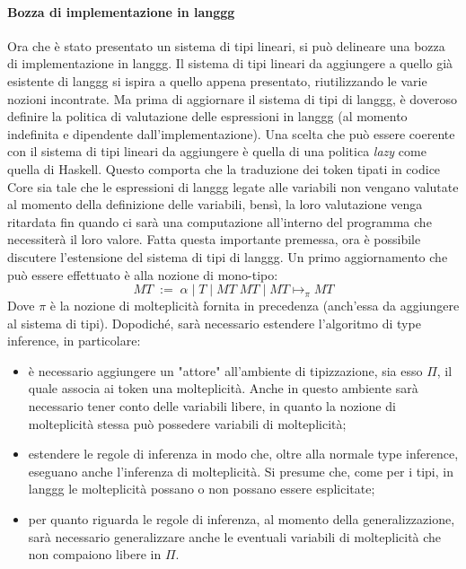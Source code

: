\documentclass[10pt,a4paper]{article}
\begin{document}
\paragraph{Bozza di implementazione in langgg}
Ora che è stato presentato un sistema di tipi lineari, si può delineare una bozza di implementazione in langgg.
Il sistema di tipi lineari da aggiungere a quello già esistente di langgg si ispira a quello appena presentato,
riutilizzando le varie nozioni incontrate. Ma prima di aggiornare il sistema di tipi di langgg, è doveroso definire
la politica di valutazione delle espressioni in langgg (al momento indefinita e dipendente dall'implementazione).
Una scelta che può essere coerente con il sistema di tipi lineari da aggiungere è quella di una politica \textit{lazy}
come quella di Haskell. Questo comporta che la traduzione dei token tipati in codice Core sia tale che le espressioni
di langgg legate alle variabili non vengano valutate al momento della definizione delle variabili, bensì, la loro
valutazione venga ritardata fin quando ci sarà una computazione all'interno del programma che necessiterà il loro
valore. Fatta questa importante premessa, ora è possibile discutere l'estensione del sistema di tipi di langgg.
Un primo aggiornamento che può essere effettuato è alla nozione di mono-tipo:
\[ MT \; := \; \alpha \; | \; T \; | \; MT \; MT \; | \; MT \mapsto_{\pi} MT \]
Dove $ \pi $ è la nozione di molteplicità fornita in precedenza (anch'essa da aggiungere al sistema di tipi).
Dopodiché, sarà necessario estendere l'algoritmo di type inference, in particolare:
\begin{itemize}
    \item è necessario aggiungere un "attore" all'ambiente di tipizzazione, sia esso $ \Pi $, il quale associa ai
    token una molteplicità. Anche in questo ambiente sarà necessario tener conto delle variabili libere, in quanto
    la nozione di molteplicità stessa può possedere variabili di molteplicità;
    \item estendere le regole di inferenza in modo che, oltre alla normale type inference, eseguano anche l'inferenza
    di molteplicità. Si presume che, come per i tipi, in langgg le molteplicità possano o non possano essere esplicitate;
    \item per quanto riguarda le regole di inferenza, al momento della generalizzazione, sarà necessario generalizzare
    anche le eventuali variabili di molteplicità che non compaiono libere in $ \Pi $.
\end{itemize}
\end{document}
